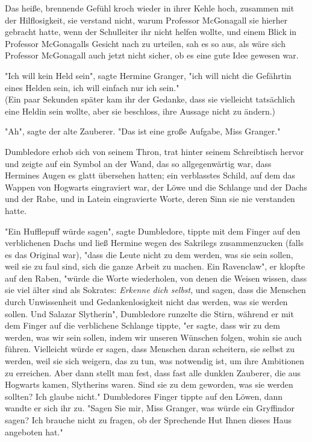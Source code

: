 {Das heiße, brennende Gefühl kroch wieder in ihrer Kehle hoch, zusammen mit der Hilflosigkeit, sie verstand nicht, warum Professor McGonagall sie hierher gebracht hatte, wenn der Schulleiter ihr nicht helfen wollte, und einem Blick in Professor McGonagalls Gesicht nach zu urteilen, sah es so aus, als wäre sich Professor McGonagall auch jetzt nicht sicher, ob es eine gute Idee gewesen war.

"Ich will kein Held sein", sagte Hermine Granger, "ich will nicht die Gefährtin eines Helden sein, ich will einfach nur ich sein."\\ (Ein paar Sekunden später kam ihr der Gedanke, dass sie vielleicht tatsächlich eine Heldin sein wollte, aber sie beschloss, ihre Aussage nicht zu ändern.)

"Ah", sagte der alte Zauberer. "Das ist eine große Aufgabe, Miss Granger."

Dumbledore erhob sich von seinem Thron, trat hinter seinem Schreibtisch hervor und zeigte auf ein Symbol an der Wand, das so allgegenwärtig war, dass Hermines Augen es glatt übersehen hatten; ein verblasstes Schild, auf dem das Wappen von Hogwarts eingraviert war, der Löwe und die Schlange und der Dachs und der Rabe, und in Latein eingravierte Worte, deren Sinn sie nie verstanden hatte.

"Ein Hufflepuff würde sagen", sagte Dumbledore, tippte mit dem Finger auf den verblichenen Dachs und ließ Hermine wegen des Sakrilegs zusammenzucken (falls es das Original war), "dass die Leute nicht zu dem werden, was sie sein sollen, weil sie zu faul sind, sich die ganze Arbeit zu machen. Ein Ravenclaw", er klopfte auf den Raben, "würde die Worte wiederholen, von denen die Weisen wissen, dass sie viel älter sind als Sokrates: \emph{Erkenne dich selbst}, und sagen, dass die Menschen durch Unwissenheit und Gedankenlosigkeit nicht das werden, was sie werden sollen. Und Salazar Slytherin", Dumbledore runzelte die Stirn, während er mit dem Finger auf die verblichene Schlange tippte, "er sagte, dass wir zu dem werden, was wir sein sollen, indem wir unseren Wünschen folgen, wohin sie auch führen. Vielleicht würde er sagen, dass Menschen daran scheitern, sie selbst zu werden, weil sie sich weigern, das zu tun, was notwendig ist, um ihre Ambitionen zu erreichen. Aber dann stellt man fest, dass fast alle dunklen Zauberer, die aus Hogwarts kamen, Slytherins waren. Sind sie zu dem geworden, was sie werden sollten? Ich glaube nicht." Dumbledores Finger tippte auf den Löwen, dann wandte er sich ihr zu. "Sagen Sie mir, Miss Granger, was würde ein Gryffindor sagen? Ich brauche nicht zu fragen, ob der Sprechende Hut Ihnen dieses Haus angeboten hat."

}
